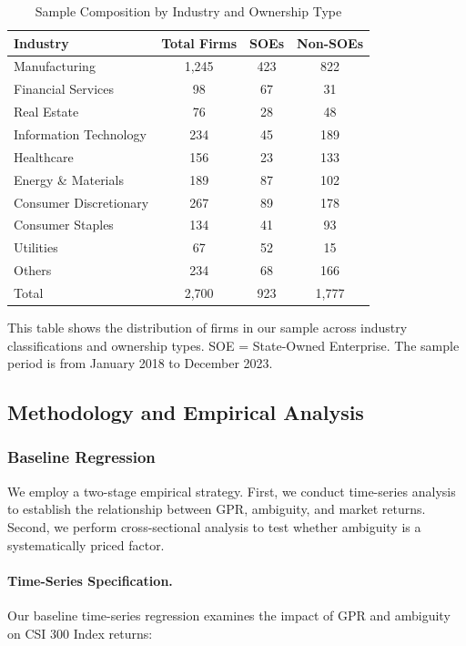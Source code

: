 \documentclass[preprint,12pt,authoryear]{elsarticle}
\begin{document}
\begin{table}[htbp]
\centering
\caption{Sample Composition by Industry and Ownership Type}
\label{tab:sample_composition}
\begin{threeparttable}
\begin{tabular}{lccc}
\toprule
Industry & Total Firms & SOEs & Non-SOEs \\
\midrule
Manufacturing & 1,245 & 423 & 822 \\
Financial Services & 98 & 67 & 31 \\
Real Estate & 76 & 28 & 48 \\
Information Technology & 234 & 45 & 189 \\
Healthcare & 156 & 23 & 133 \\
Energy \& Materials & 189 & 87 & 102 \\
Consumer Discretionary & 267 & 89 & 178 \\
Consumer Staples & 134 & 41 & 93 \\
Utilities & 67 & 52 & 15 \\
Others & 234 & 68 & 166 \\
\midrule
Total & 2,700 & 923 & 1,777 \\
\bottomrule
\end{tabular}
\begin{tablenotes}
\small
\item This table shows the distribution of firms in our sample across industry classifications and ownership types. SOE = State-Owned Enterprise. The sample period is from January 2018 to December 2023.
\end{tablenotes}
\end{threeparttable}
\end{table}

\subsection{Methodology and Empirical Analysis}

\subsubsection{Baseline Regression}

We employ a two-stage empirical strategy. First, we conduct time-series analysis to establish the relationship between GPR, ambiguity, and market returns. Second, we perform cross-sectional analysis to test whether ambiguity is a systematically priced factor.

\paragraph{Time-Series Specification.}
Our baseline time-series regression examines the impact of GPR and ambiguity on CSI 300 Index returns:
\end{document}
